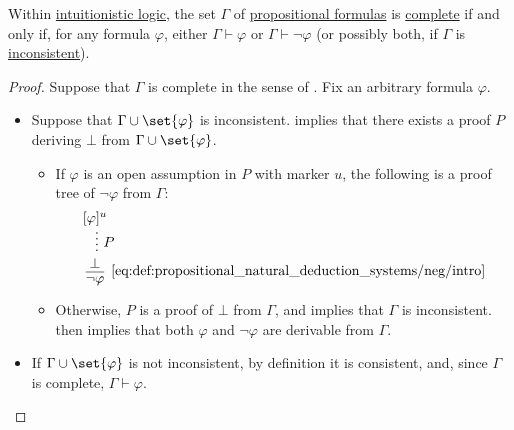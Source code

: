\begin{proposition}\label{thm:propositional_complete_set}
  Within \hyperref[def:intuitionistic_logic]{intuitionistic logic}, the set \( \Gamma \) of \hyperref[def:propositional_syntax/formula]{propositional formulas} is \hyperref[def:complete_set_of_sentences]{complete} if and only if, for any formula \( \varphi \), either \( \Gamma \vdash \varphi \) or \( \Gamma \vdash \neg \varphi \) (or possibly both, if \( \Gamma \) is \hyperref[def:consistent_set_of_sentences]{inconsistent}).
\end{proposition}
\begin{proof}
  \SufficiencySubProof Suppose that \( \Gamma \) is complete in the sense of . Fix an arbitrary formula \( \varphi \).

  \begin{itemize}
    \item Suppose that \( \Gamma \cup \set{ \varphi } \) is inconsistent.  implies that there exists a proof \( P \) deriving \( \bot \) from \( \Gamma \cup \set{ \varphi } \).

    \begin{itemize}
      \item If \( \varphi \) is an open assumption in \( P \) with marker \( u \), the following is a proof tree of \( \neg \varphi \) from \( \Gamma \):
      \begin{equation*}
        \begin{prooftree}
          \hypo{ [\varphi]^u }
          \ellipsis { \( P \) } { \bot }
          \infer1[\eqref{eq:def:propositional_natural_deduction_systems/neg/intro}]{ \neg \varphi }.
        \end{prooftree}
      \end{equation*}

      \item Otherwise, \( P \) is a proof of \( \bot \) from \( \Gamma \), and  implies that \( \Gamma \) is inconsistent.  then implies that both \( \varphi \) and \( \neg \varphi \) are derivable from \( \Gamma \).
    \end{itemize}

    \item If \( \Gamma \cup \set{ \varphi } \) is not inconsistent, by definition it is consistent, and, since \( \Gamma \) is complete, \( \Gamma \vdash \varphi \).
  \end{itemize}


\end{proof}
